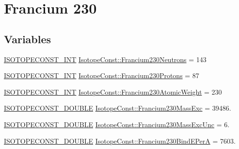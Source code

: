\hypertarget{group___isotope_const-_francium-_fr230}{}\section{Francium 230}
\label{group___isotope_const-_francium-_fr230}
\subsection*{Variables}
\begin{DoxyCompactItemize}
\item 
\mbox{\hyperlink{group___isotope_const-_macros_ga5f18360b3e99483a35c32d789e62621c}{I\+S\+O\+T\+O\+P\+E\+C\+O\+N\+S\+T\+\_\+\+I\+NT}} \mbox{\hyperlink{group___isotope_const-_francium-_fr230_ga684decb342353e1a3ecfcb42ea7ab300}{Isotope\+Const\+::\+Francium230\+Neutrons}} = 143
\item 
\mbox{\hyperlink{group___isotope_const-_macros_ga5f18360b3e99483a35c32d789e62621c}{I\+S\+O\+T\+O\+P\+E\+C\+O\+N\+S\+T\+\_\+\+I\+NT}} \mbox{\hyperlink{group___isotope_const-_francium-_fr230_gae80911aa6821b8aad854bc962ca8df99}{Isotope\+Const\+::\+Francium230\+Protons}} = 87
\item 
\mbox{\hyperlink{group___isotope_const-_macros_ga5f18360b3e99483a35c32d789e62621c}{I\+S\+O\+T\+O\+P\+E\+C\+O\+N\+S\+T\+\_\+\+I\+NT}} \mbox{\hyperlink{group___isotope_const-_francium-_fr230_ga8c6d53b7209ee87efb0e5b9b6263e1aa}{Isotope\+Const\+::\+Francium230\+Atomic\+Weight}} = 230
\item 
\mbox{\hyperlink{group___isotope_const-_macros_ga8f45a7272ce02c0b4c65c44636ed719a}{I\+S\+O\+T\+O\+P\+E\+C\+O\+N\+S\+T\+\_\+\+D\+O\+U\+B\+LE}} \mbox{\hyperlink{group___isotope_const-_francium-_fr230_gad00e1d6bdacf02483f502853d07743cf}{Isotope\+Const\+::\+Francium230\+Mass\+Exc}} = 39486.
\item 
\mbox{\hyperlink{group___isotope_const-_macros_ga8f45a7272ce02c0b4c65c44636ed719a}{I\+S\+O\+T\+O\+P\+E\+C\+O\+N\+S\+T\+\_\+\+D\+O\+U\+B\+LE}} \mbox{\hyperlink{group___isotope_const-_francium-_fr230_gab18332994aa46574af59802a34cffe9d}{Isotope\+Const\+::\+Francium230\+Mass\+Exc\+Unc}} = 6.
\item 
\mbox{\hyperlink{group___isotope_const-_macros_ga8f45a7272ce02c0b4c65c44636ed719a}{I\+S\+O\+T\+O\+P\+E\+C\+O\+N\+S\+T\+\_\+\+D\+O\+U\+B\+LE}} \mbox{\hyperlink{group___isotope_const-_francium-_fr230_gab26b7dac2482a017960433f5ae3c44fd}{Isotope\+Const\+::\+Francium230\+Bind\+E\+PerA}} = 7603.
\item 

\end{DoxyCompactItemize}
